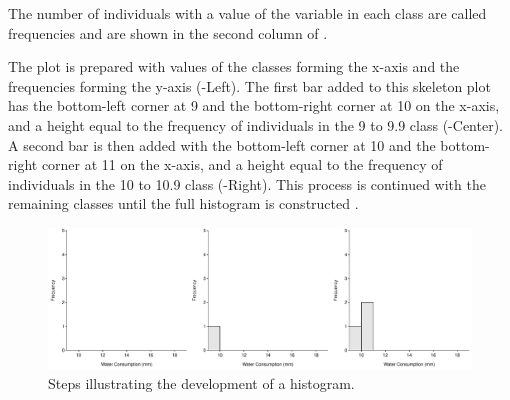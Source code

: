 \documentclass[10pt,openany]{book}\usepackage[]{graphicx}\usepackage[]{color}
\newenvironment{knitrout}{}{} %
\begin{document}
The number of individuals with a value of the variable in each class are called frequencies and are shown in the second column of .

The plot is prepared with values of the classes forming the x-axis and the frequencies forming the y-axis (-Left).  The first bar added to this skeleton plot has the bottom-left corner at 9 and the bottom-right corner at 10 on the x-axis, and a height equal to the frequency of individuals in the 9 to 9.9 class (-Center).  A second bar is then added with the bottom-left corner at 10 and the bottom-right corner at 11 on the x-axis, and a height equal to the frequency of individuals in the 10 to 10.9 class (-Right).  This process is continued with the remaining classes until the full histogram is constructed .

\begin{knitrout}
\color{fgcolor}\begin{figure}[hbtp]

{\centering \includegraphics[width=.95\linewidth]{Figs/MouseHist1-1} 

}

\caption[Steps illustrating the development of a histogram]{Steps illustrating the development of a histogram.}\label{fig:MouseHist1}
\end{figure}


\end{knitrout}

\vspace{24pt}  %
\end{document}
